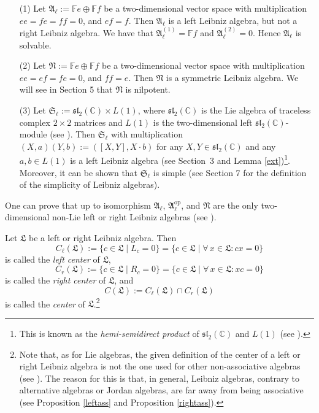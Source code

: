\documentclass{amsart}
\numberwithin{equation}{section}
\newcommand{\op}{\mathrm{op}}
\newcommand{\F}{\mathbb{F}}
\newcommand{\C}{\mathbb{C}}
\newcommand{\af}{\mathfrak{A}}
\newcommand{\Sf}{\mathfrak{S}}
\newcommand{\lf}{\mathfrak{L}}
\newcommand{\nf}{\mathfrak{N}}
\newcommand{\slf}{\mathfrak{sl}}
\begin{document}
\begin{enumerate}
\item[(1)] Let $\af_\ell:=\F e\oplus\F f$ be a two-dimensional vector space with multiplication
                $ee=fe=ff=0$, and $ef=f$. Then $\af_\ell$ is a left Leibniz algebra, but not a right
                Leibniz algebra. We have that $\af_\ell^{(1)}=\F f$ and $\af_\ell^{(2)}=0$. Hence
                $\af_\ell$ is solvable.
\item[(2)] Let $\nf:=\F e\oplus\F f$ be a two-dimensional vector space with multiplication $ee=
                ef=fe=0$, and $ff=e$. Then $\nf$ is a symmetric Leibniz algebra. We will see
                in Section 5 that $\nf$ is nilpotent.
\item[(3)] Let $\Sf_\ell:=\slf_2(\C)\times L(1)$, where $\slf_2(\C)$ is the Lie algebra of traceless
                complex $2\times 2$ matrices and $L(1)$ is the two-dimensional left $\slf_2(\C)$-module
                (see \cite[Lemma 7.2]{H}). Then $\Sf_\ell$ with multiplication $(X,a)(Y,b):=([X,Y],X
                \cdot b)$ for any $X,Y\in\slf_2(\C)$ and any $a,b\in L(1)$ is a left Leibniz algebra (see
                Section~3 and Lemma \ref{ext})\footnote{This is known as the {\em hemi-semidirect product\/}
                of $\slf_2(\C)$ and $L(1)$ (see \cite[Definition 1.5]{OW}).}. Moreover, it can be shown
                that $\Sf_\ell$ is simple (see Section 7 for the definition of the simplicity of Leibniz algebras).
\end{enumerate}
\vspace{.3cm}

 One can prove that up to isomorphism $\af_\ell$, $\af_\ell^\op$, and $\nf$
are the only two-dimensional non-Lie left or right Leibniz algebras (see \cite[pp. 11/12]{DMS1}).
\vspace{.2cm}

Let $\lf$ be a left or right Leibniz algebra. Then $$C_\ell(\lf):=\{c\in\lf\mid L_c=0\}=\{c\in\lf
\mid\forall\,x\in\lf:cx=0\}$$  is called the {\it left center\/} of $\lf$, $$C_r(\lf):=\{c\in\lf
\mid R_c=0\}=\{c\in\lf\mid\forall\,x\in\lf:xc=0\}$$ is called the {\it right center\/} of $\lf$,
and $$C(\lf):=C_\ell(\lf)\cap C_r(\lf)$$ is called the {\em center\/} of $\lf$.\footnote{Note
that, as for Lie algebras, the given definition of the center of a left or right Leibniz algebra is
not the one used for other non-associative algebras (see \cite[p.\ 14]{S}). The reason for
this is that, in general, Leibniz algebras, contrary to alternative algebras or Jordan algebras,
are far away from being associative (see Proposition \ref{leftass} and Proposition \ref{rightass}).}
\vspace{.4cm}
\end{document}
